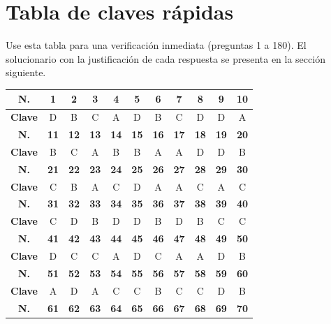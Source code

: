 \newpage
\section*{Tabla de claves rápidas}

\noindent Use esta tabla para una verificación inmediata (preguntas 1 a 180). El solucionario con la justificación de cada respuesta se presenta en la sección siguiente.

\vspace{0.35cm}
\begin{center}
\footnotesize
\renewcommand{\arraystretch}{1.25}
\begin{tabular}{|c|c|c|c|c|c|c|c|c|c|c|}
\hline
\textbf{N.} & \textbf{1} & \textbf{2} & \textbf{3} & \textbf{4} & \textbf{5} & \textbf{6} & \textbf{7} & \textbf{8} & \textbf{9} & \textbf{10} \\
\hline
\textbf{Clave} & D & B & C & A & D & B & C & D & D & A \\
\hline
\textbf{N.} & \textbf{11} & \textbf{12} & \textbf{13} & \textbf{14} & \textbf{15} & \textbf{16} & \textbf{17} & \textbf{18} & \textbf{19} & \textbf{20} \\
\hline
\textbf{Clave} & B & C & A & B & B & A & A & D & D & B \\
\hline
\textbf{N.} & \textbf{21} & \textbf{22} & \textbf{23} & \textbf{24} & \textbf{25} & \textbf{26} & \textbf{27} & \textbf{28} & \textbf{29} & \textbf{30} \\
\hline
\textbf{Clave} & C & B & A & C & D & A & A & C & A & C \\
\hline
\textbf{N.} & \textbf{31} & \textbf{32} & \textbf{33} & \textbf{34} & \textbf{35} & \textbf{36} & \textbf{37} & \textbf{38} & \textbf{39} & \textbf{40} \\
\hline
\textbf{Clave} & C & D & B & D & D & B & D & B & C & C \\
\hline
\textbf{N.} & \textbf{41} & \textbf{42} & \textbf{43} & \textbf{44} & \textbf{45} & \textbf{46} & \textbf{47} & \textbf{48} & \textbf{49} & \textbf{50} \\
\hline
\textbf{Clave} & D & C & C & A & D & C & A & A & D & B \\
\hline
\textbf{N.} & \textbf{51} & \textbf{52} & \textbf{53} & \textbf{54} & \textbf{55} & \textbf{56} & \textbf{57} & \textbf{58} & \textbf{59} & \textbf{60} \\
\hline
\textbf{Clave} & A & D & A & C & C & B & C & C & D & B \\
\hline
\textbf{N.} & \textbf{61} & \textbf{62} & \textbf{63} & \textbf{64} & \textbf{65} & \textbf{66} & \textbf{67} & \textbf{68} & \textbf{69} & \textbf{70} \\

\end{tabular}
\end{center}
